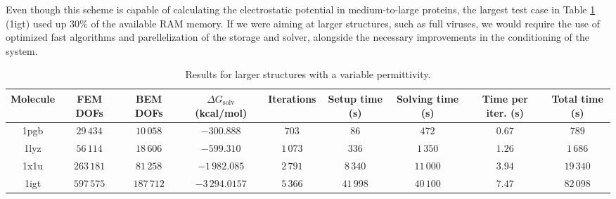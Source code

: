 Even though this scheme is capable of calculating the electrostatic potential in medium-to-large proteins, the largest test case in Table \ref{table:large_variable} (1igt) used up 30\% of the available RAM memory. 
If we were aiming at larger structures, such as full viruses,\cite{MartinezETal2019,wang2021high} we would require the use of optimized fast algorithms\cite{wang2021exafmm,kailasa2023pyexafmm} and
parellelization of the storage and solver, alongside the necessary improvements in the conditioning of the system.

\begin{table}
\centering
\footnotesize
\begin{tabular}{c|c|c|c|c|c|c|c|c}
Molecule & \parbox{1.1cm}{\centering FEM DOFs}  & \parbox{1.1cm}{\centering BEM DOFs} &  \parbox{1.8cm}{\centering $\Delta G_{\text{solv}}$ (kcal/mol)}& Iterations & \parbox{1.3cm}{\centering Setup time (s)} & \parbox{1.3cm}{\centering Solving time (s)} & \parbox{1.5cm}{\centering Time per iter. (s)} & \parbox{1.4cm}{\centering Total time (s)} \\[3mm]
\hline
  1pgb  & $29\,434$ &  $10\,058$ &  $-300.888$ & $703$ & $86$ & $472$ & $0.67$ & $789$  \\
 1lyz  & $56\,114$ & $18\,606$ &  $-599.310$ & $1\,073$ & $336$ & $1\,350$  & $1.26$ & $1\,686$   \\
 1x1u & $263\,181$ & $81\,258$ & $-1\,982.085$ & $2\,791$ & $8\,340$ & $11\,000$ & $3.94$ & $19\,340$  \\
 1igt & $597\,575$ & $187\,712$ &  $-3\,294.0157$ & $5\, 366$ & $41\,998$ & $40\,100$ &  $7.47$ & $82\,098$    \\
\end{tabular}
\caption{Results for larger structures with a variable permittivity.}
\label{table:large_variable}
\end{table}
